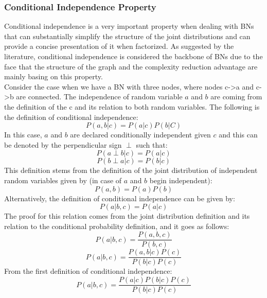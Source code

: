 \documentclass{article}
\begin{document}
\subsubsection{Conditional Independence Property}
Conditional independence is a very important property when dealing with BNs that can substantially simplify the structure of the joint distributions and can provide a concise presentation of it when factorized. As suggested by the literature, conditional independence is considered the backbone of BNs due to the face that the structure of the graph and the complexity reduction advantage are mainly basing on this property. \\
Consider the case when we have a BN with three nodes, where nodes c->a and c->b are connected. The independence of random variable $a$ and $b$ are coming from the definition of the c and its relation to both random variables. The following is the definition of conditional independence:
\begin{equation}
P(a,b|c) = P(a|c)P(b|C)
\end{equation}
In this case, $a$ and $b$ are declared conditionally independent given $c$ and this can be denoted by the perpendicular sign $\perp$ such that:
\begin{equation}
P(a \perp b |c) = P(a|c)
\end{equation}
\begin{equation}
P(b \perp a |c) = P(b|c)
\end{equation}
This definition stems from the definition of the joint distribution of independent random variables given by (in case of $a$ and $b$ begin independent):
\begin{equation}
P(a,b) = P(a)P(b)
\end{equation} 
Alternatively, the definition of conditional independence can be given by:
\begin{equation}
P(a|b,c) = P(a|c)
\end{equation}
The proof for this relation comes from the joint distribution definition and its relation to the conditional probability definition, and it goes as follows:
\begin{equation}
P(a|b,c) = \frac{P(a,b,c)}{P(b,c)}
\end{equation}
\begin{equation}
P(a|b,c) = \frac{P(a,b|c)P(c)}{P(b|c)P(c)}
\end{equation}
From the first definition of conditional independence:
\begin{equation}
P(a|b,c) = \frac{P(a|c)P(b|c) P(c)}{P(b|c)P(c)}
\end{equation}
\end{document}
